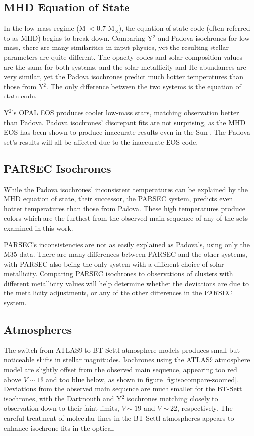\documentclass[iop]{emulateapj}
\begin{document}
\subsection{MHD Equation of State}
In the low-mass regime (M $<0.7$ M$_\odot$), the \citet{1990ApJ...350..300M} equation of state code (often referred to as MHD) begins to break down. Comparing Y$^2$ and Padova isochrones for low mass, there are many similarities in input physics, yet the resulting stellar parameters are quite different. The opacity codes and solar composition values are the same for both systems, and the solar metallicity and He abundances are very similar, yet the Padova isochrones predict much hotter temperatures than those from Y$^2$. The only difference between the two systems is the equation of state code.

Y$^2$'s OPAL EOS \citep{1996ApJ...456..902R} produces cooler low-mass stars, matching observation better than Padova. Padova isochrones' discrepant fits are not surprising, as the MHD EOS has been shown to produce inaccurate results even in the Sun \citep{1992AcA....42....5D}. The Padova set's results will all be affected due to the inaccurate EOS code.


\subsection{PARSEC Isochrones}
While the Padova isochrones' inconsistent temperatures can be explained by the MHD equation of state, their successor, the PARSEC system, predicts even hotter temperatures than those from Padova. These high temperatures produce colors which are the furthest from the observed main sequence of any of the sets examined in this work.

PARSEC's inconsistencies are not as easily explained as Padova's, using only the M35 data. There are many differences between PARSEC and the other systems, with PARSEC also being the only system with a different choice of solar metallicity. Comparing PARSEC isochrones to observations of clusters with different metallicity values will help determine whether the deviations are due to the metallicity adjustments, or any of the other differences in the PARSEC system.


\subsection{Atmospheres}
The switch from ATLAS9 to BT-Settl atmosphere models produces small but noticeable shifts in stellar magnitudes. Isochrones using the ATLAS9 atmosphere model are slightly offset from the observed main sequence, appearing too red above $V \sim 18$ and too blue below, as shown in figure \ref{fig:isocompare-zoomed}. Deviations from the observed main sequence are much smaller for the BT-Settl isochrones, with the Dartmouth and Y$^2$ isochrones matching closely to observation down to their faint limits, $V \sim 19$ and $V \sim 22$, respectively. The careful treatment of molecular lines in the BT-Settl atmospheres appears to enhance isochrone fits in the optical.
\end{document}
